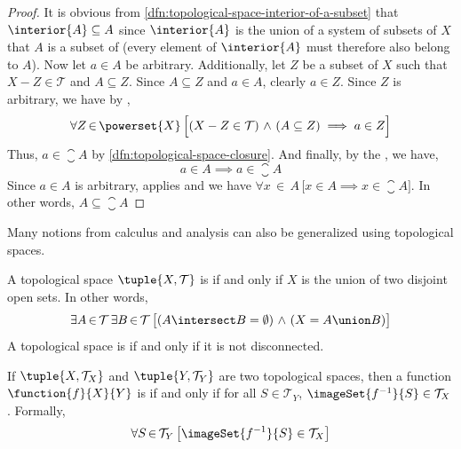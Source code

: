 \begin{proof}
    It is obvious from \cref{dfn:topological-space-interior-of-a-subset} that \( \interior{A} \subseteq A \) since
    \( \interior{A} \) is the union of a system of subsets of \( X \) that \( A \) is a subset of (every element of
    \( \interior{A} \) must therefore also belong to \( A \)).
    Now let \( a \in A \) be arbitrary. Additionally, let \( Z \) be a subset of \( X \) such that \( X - Z \in \mathcal{T} \) and \( A \subseteq Z \).
    Since \( A \subseteq Z \) and \( a \in A \), clearly \( a \in Z \).
    Since \( Z \) is arbitrary, we have by ,
    \begin{equation*}
        \forall Z\,{\in}\,\powerset{X} \, \Big[ (X - Z \in \mathcal{T}) \,\,{\land}\,\, \mleft( A \subseteq Z \mright) \implies a \in Z \Big]
    \end{equation*}
    Thus, \( a \in \closure{A} \) by \cref{dfn:topological-space-closure}. And finally, by the , we have,
    \begin{equation*}
        a \in A \implies a \in \closure{A}
    \end{equation*}
    Since \( a \in A \) is arbitrary,  applies and we have
    \( \forall x\,{\in}\,A \, \big[ x \in A {\implies} x \in \closure{A} \big] \). In other words, \( A \subseteq \closure{A} \)
\end{proof}

\noindent
Many notions from calculus and analysis can also be generalized using topological spaces.

\begin{dfn}[Connectedness]
     \label{dfn:topological-space-connectedness}
    A topological space \( \tuple{X, \mathcal{T}} \) is  if and only if \( X \) is the union of two disjoint open sets.
    In other words,
    \begin{equation*}
        \exists A\,{\in}\,\mathcal{T} \, \exists B\,{\in}\,\mathcal{T} \, \big[ (A \intersect B = \emptyset) \,\,{\land}\,\, (X = A \union B) \big]
    \end{equation*}
    A topological space is  if and only if it is not disconnected.
\end{dfn}

\begin{dfn}[Continuity]
     \label{dfn:topological-space-continuity}
    If \( \tuple{X, \mathcal{T}_{X}} \) and \( \tuple{Y, \mathcal{T}_{Y}} \) are two topological spaces, then a function
    \( \function{f}{X}{Y} \) is  if and only if for all \( S \in \mathcal{T}_{Y} \),
    \( \imageSet{f^{-1}}{S} \in \mathcal{T}_{X} \). Formally,
    \begin{equation*}
        \forall S\,{\in}\,\mathcal{T}_{Y} \, \big[ \imageSet{f^{-1}}{S} \in \mathcal{T}_{X} \big]
    \end{equation*}
\end{dfn}

